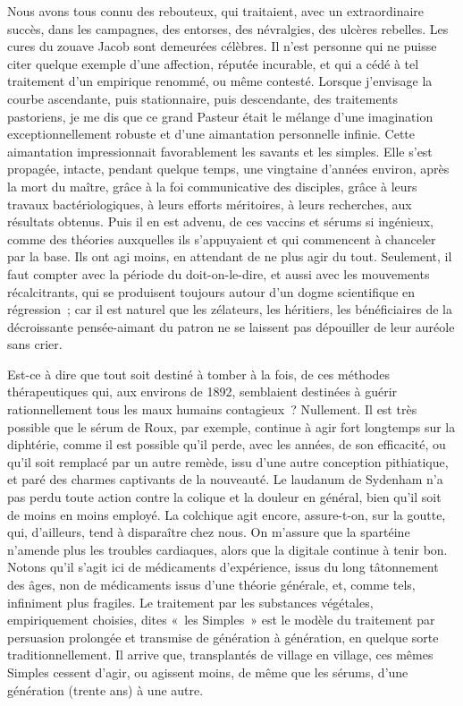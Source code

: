 \documentclass[french,twoside]{book} %
\begin{document}
Nous avons tous connu des rebouteux, qui traitaient, avec un extraordinaire succès, dans les campagnes, des entorses, des névralgies, des ulcères rebelles. Les cures du zouave Jacob sont demeurées célèbres. Il n’est personne qui ne puisse citer quelque exemple d’une affection, réputée incurable, et qui a cédé à tel traitement d’un empirique renommé, ou même contesté. Lorsque j’envisage la courbe ascendante, puis stationnaire, puis descendante, des traitements pastoriens, je me dis que ce grand Pasteur était le mélange d’une imagination exceptionnellement robuste et d’une aimantation personnelle infinie. Cette aimantation impressionnait favorablement les savants et les simples. Elle s’est propagée, intacte, pendant quelque temps, une vingtaine d’années environ, après la mort du maître, grâce à la foi communicative des disciples, grâce à leurs travaux bactériologiques, à leurs efforts méritoires, à leurs recherches, aux résultats obtenus. Puis il en est advenu, de ces vaccins et sérums si ingénieux, comme des théories auxquelles ils s’appuyaient et qui commencent à chanceler par la base. Ils ont agi moins, en attendant de ne plus agir du tout. Seulement, il faut compter avec la période du doit-on-le-dire, et aussi avec les mouvements récalcitrants, qui se produisent toujours autour d’un dogme scientifique en régression ; car il est naturel que les zélateurs, les héritiers, les bénéficiaires de la décroissante pensée-aimant du patron ne se laissent pas dépouiller de leur auréole sans crier.\par
Est-ce à dire que tout soit destiné à tomber à la fois, de ces méthodes thérapeutiques qui, aux environs de 1892, semblaient destinées à guérir rationnellement tous les maux humains contagieux ? Nullement. Il est très possible que le sérum de Roux, par exemple, continue à agir fort longtemps sur la diphtérie, comme il est possible qu’il perde, avec les années, de son efficacité, ou qu’il soit remplacé par un autre remède, issu d’une autre conception pithiatique, et paré des charmes captivants de la nouveauté. Le laudanum de Sydenham n’a pas perdu toute action contre la colique et la douleur en général, bien qu’il soit de moins en moins employé. La colchique agit encore, assure-t-on, sur la goutte, qui, d’ailleurs, tend à disparaître chez nous. On m’assure que la spartéine n’amende plus les troubles cardiaques, alors que la digitale continue à tenir bon. Notons qu’il s’agit ici de médicaments d’expérience, issus du long tâtonnement des âges, non de médicaments issus d’une théorie générale, et, comme tels, infiniment plus fragiles. Le traitement par les substances végétales, empiriquement choisies, dites « les Simples » est le modèle du traitement par persuasion prolongée et transmise de génération à génération, en quelque sorte traditionnellement. Il arrive que, transplantés de village en village, ces mêmes Simples cessent d’agir, ou agissent moins, de même que les sérums, d’une génération (trente ans) à une autre.\par
\end{document}
